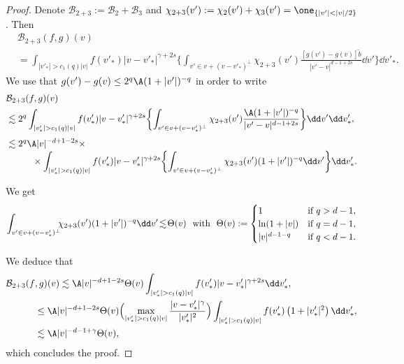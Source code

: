 \begin{proof}
Denote $\mathcal{B}_{2+3} := \mathcal{B}_2 + \mathcal{B}_3$ and
$\chi_{2+3}(v') :=\chi_2(v') + \chi_3(v') = \one_{\{|v'|
<|v|/2\}}$. Then
\begin{align*}
&\mathcal{B}_{2+3}(f,g)(v) \\
& = \int_{|v'_*| > c_1(q)|v|} f(v'_*)
|v-v'_*|^{\gamma+2s} \biggl\{ \int_{v' \in v + (v-v'_*)^\bot}
\chi_{2+3}(v') \frac{\left[g(v')-g(v)\right] \tilde
b}{|v'-v|^{d-1+2s}} \dd v' \biggr\} \dd v'_*.
\end{align*}
We use that
$g(v') - g(v) \leq 2^q \A (1+|v'|)^{-q}$ in order
to write
\begin{align*}
& \mathcal{B}_{2+3}(f,g)(v)\\
& \lesssim 2^q \int_{|v'_*| > c_1(q) |v|} f(v'_*) |v-v'_*|^{\gamma+2s}
\biggl\{ \int_{v' \in v + (v-v'_*)^\bot} \chi_{2+3}(v')
\frac{\A (1+|v'|)^{-q}}{|v'-v|^{d-1+2s}} \biggr\} \dd v' \dd v'_*, \\[3pt]
&\lesssim 2^q \A |v|^{-d+1-2s} \times \\[-3pt]
& \hspace{1cm} \times \int_{|v'_*| > c_1(q) |v|} f(v'_*)
|v-v'_*|^{\gamma+2s}
\biggl\{ \int_{v' \in v+(v-v'_*)^\bot} \chi_{2+3}(v') (1+|v'|)^{-q} \dd v' \biggr\} \dd v'_*.
\end{align*}

We get
\[
\int_{v' \in v + (v-v'_*)^\bot}\hspace*{-5pt} \chi_{2+3}(v') (1+|v'|)^{-q} \dd
v' \!\lesssim\! \Theta(v)
\ \mbox{ with } \
\Theta(v) :=
\begin{cases}
1 &\text{if } q > d-1,\\
\ln (1+|v|) &\text{if } q = d-1, \\
|v|^{d-1-q} &\text{if } q < d-1.
\end{cases}
\]

We deduce that
\begin{align*}
\mathcal{B}_{2+3}(f&,g) (v)
\lesssim \A |v|^{-d+1-2s} \Theta(v)
\int_{|v'_*| > c_1(q) |v|} f(v'_*) |v-v'_*|^{\gamma+2s} \dd v'_*, \\
&\leq \A |v|^{-d+1-2s} \Theta(v) \Bigl( \max_{|v'_*| > c_1(q) |v|}
\frac{|v-v'_*|^\gamma}{|v'_*|^2} \Bigr)
\int_{|v'_*| > c_1(q) |v|} f(v'_*) \left(1+|v'_*|^2\right) \dd v'_*, \\
&\lesssim \A |v|^{-d-1+\gamma} \Theta(v),
\end{align*}
which concludes the proof.
\end{proof}



